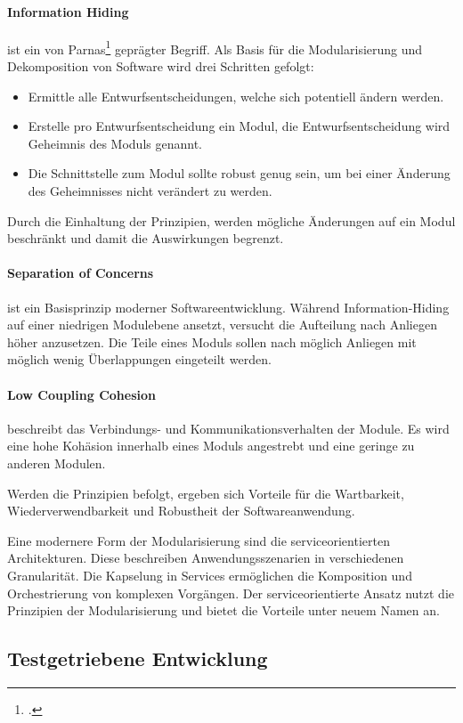 \paragraph{Information Hiding} ist ein von Parnas\footcite{1972-parnas} geprägter Begriff. Als Basis für die Modularisierung und Dekomposition von Software wird drei Schritten gefolgt:
\begin{itemize}
\item Ermittle alle Entwurfsentscheidungen, welche sich potentiell ändern werden.
\item Erstelle pro Entwurfsentscheidung ein Modul, die Entwurfsentscheidung wird \glqq Geheimnis des Moduls\grqq{} genannt.
\item Die Schnittstelle zum Modul sollte robust genug sein, um bei einer Änderung des Geheimnisses nicht verändert zu werden.
\end{itemize}
Durch die Einhaltung der Prinzipien, werden mögliche Änderungen auf ein Modul beschränkt und damit die Auswirkungen begrenzt.
\paragraph{Separation of Concerns} ist ein Basisprinzip moderner Softwareentwicklung. Während Information-Hiding auf einer niedrigen Modulebene ansetzt, versucht die \glqq Aufteilung nach Anliegen\grqq{} höher anzusetzen. Die Teile eines Moduls sollen nach möglich Anliegen  mit möglich wenig Überlappungen eingeteilt werden.
\paragraph{Low Coupling Cohesion} beschreibt das Verbindungs- und Kommunikationsverhalten der Module. Es wird eine hohe Kohäsion innerhalb eines Moduls angestrebt und eine geringe zu anderen Modulen.

Werden die Prinzipien befolgt, ergeben sich Vorteile für die Wartbarkeit, Wiederverwendbarkeit und Robustheit der Softwareanwendung. 

Eine modernere Form der Modularisierung sind die \glqq serviceorientierten Architekturen\grqq{}. Diese beschreiben Anwendungsszenarien in verschiedenen Granularität. Die Kapselung in Services ermöglichen die Komposition und Orchestrierung von komplexen Vorgängen. Der serviceorientierte Ansatz nutzt die Prinzipien der Modularisierung und bietet die Vorteile unter neuem Namen an.

\subsection{Testgetriebene Entwicklung}
\label{test-driven-development}


